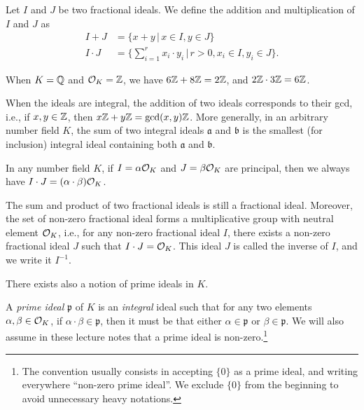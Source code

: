 \begin{definition}
Let $I$ and $J$ be two fractional ideals. We define the addition and multiplication of $I$ and $J$ as
\begin{align*}
I + J &= \{x + y \,|\, x \in I, y \in J\} \\
I \cdot J &= \{ \sum_{i = 1}^r x_i \cdot y_i \,|\, r > 0, x_i \in I, y_i \in J\}.
\end{align*}
\end{definition}

\begin{example}
When $K = \mathbb{Q}$ and $\mathcal{O}_K = \mathbb{Z}$, we have $6\mathbb{Z} + 8 \mathbb{Z} = 2\mathbb{Z}$, and $2 \mathbb{Z} \cdot 3 \mathbb{Z} = 6 \mathbb{Z}$.

When the ideals are integral, the addition of two ideals corresponds to their gcd, i.e., if $x, y \in \mathbb{Z}$, then $x \mathbb{Z} + y \mathbb{Z} = \gcd(x,y) \mathbb{Z}$. More generally, in an arbitrary number field $K$, the sum of two integral ideals $\mathfrak{a}$ and $\mathfrak{b}$ is the smallest (for inclusion) integral ideal containing both $\mathfrak{a}$ and $\mathfrak{b}$.

In any number field $K$, if $I = \alpha \mathcal{O}_K$ and $J = \beta \mathcal{O}_K$ are principal, then we always have $I\cdot J = (\alpha \cdot \beta)\mathcal{O}_K$.
\end{example}

\begin{lemma}
The sum and product of two fractional ideals is still a fractional ideal. Moreover, the set of non-zero fractional ideal forms a multiplicative group with neutral element $\mathcal{O}_K$, i.e., for any non-zero fractional ideal $I$, there exists a non-zero fractional ideal $J$ such that $I \cdot J = \mathcal{O}_K$. This ideal $J$ is called the inverse of $I$, and we write it $I^{-1}$.
\end{lemma}

There exists also a notion of prime ideals in $K$.

\begin{definition}
A \emph{prime ideal} $\mathfrak{p}$ of $K$ is an \emph{integral} ideal such that for any two elements $\alpha, \beta \in \mathcal{O}_K$, if $\alpha \cdot \beta \in \mathfrak{p}$, then it must be that either $\alpha \in \mathfrak{p}$ or $\beta \in \mathfrak{p}$.
We will also assume in these lecture notes that a prime ideal is non-zero.\footnote{The convention usually consists in accepting $\{0\}$ as a prime ideal, and writing everywhere ``non-zero prime ideal''. We exclude $\{0\}$ from the beginning to avoid unnecessary heavy notations.}
\end{definition}

